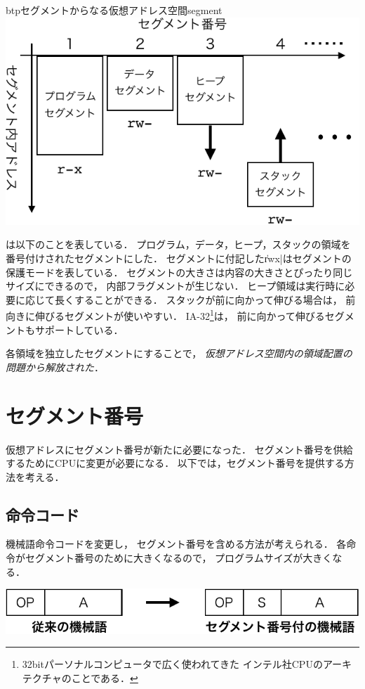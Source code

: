 \begin{myfig}{btp}{セグメントからなる仮想アドレス空間}{segment}
  \includegraphics[scale=0.88]{Fig/segment-crop.pdf}
\end{myfig}

は以下のことを表している．
プログラム，データ，ヒープ，スタックの領域を番号付けされたセグメントにした．
セグメントに付記した\|rwx|はセグメントの保護モードを表している．
セグメントの大きさは内容の大きさとぴったり同じサイズにできるので，
内部フラグメントが生じない．
ヒープ領域は実行時に必要に応じて長くすることができる．
スタックが前に向かって伸びる場合は，
前向きに伸びるセグメントが使いやすい．
IA-32\footnote{
  32bitパーソナルコンピュータで広く使われてきた
  インテル社CPUのアーキテクチャのことである．}は，
前に向かって伸びるセグメントもサポートしている\cite{ia32Segmentation}．

各領域を独立したセグメントにすることで，
\emph{仮想アドレス空間内の領域配置の問題から解放された}．

\section{セグメント番号}
仮想アドレスにセグメント番号が新たに必要になった．
セグメント番号を供給するためにCPUに変更が必要になる．
以下では，セグメント番号を提供する方法を考える．

\subsection{命令コード}
機械語命令コードを変更し，
セグメント番号を含める方法が考えられる．
各命令がセグメント番号のために大きくなるので，
プログラムサイズが大きくなる．
\begin{center}
  \includegraphics[scale=0.77]{Fig/segmentationInstruction-crop.pdf}
\end{center}

